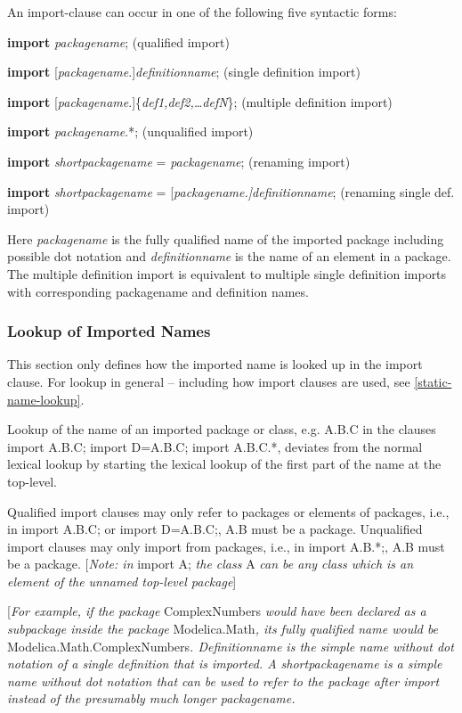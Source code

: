 \documentclass[10pt,a4paper]{report}
\def\doublelabel#1{\label{#1}\hypertarget{#1}{}}
\begin{document}
An import-clause can occur in one of the following five syntactic forms:

\textbf{import} \emph{packagename}; (qualified import)

\textbf{import} {[}\emph{packagename}.{]}\emph{definitionname}; (single
definition import)

\textbf{import}
{[}\emph{packagename}.{]}\{\emph{def1,def2,\ldots{}defN}\}; (multiple
definition import)

\textbf{import} \emph{packagename}.*; (unqualified import)

\textbf{import} \emph{shortpackagename} = \emph{packagename}; (renaming
import)

\textbf{import} \emph{shortpackagename} =
{[}\emph{packagename.{]}definitionname}; (renaming single def. import)

Here \emph{packagename} is the fully qualified name of the imported
package including possible dot notation and \emph{definitionname} is the
name of an element in a package. The multiple definition import is
equivalent to multiple single definition imports with corresponding
packagename and definition names.

\subsubsection{Lookup of Imported Names}\doublelabel{lookup-of-imported-names}

This section only defines how the imported name is looked up in the
import clause. For lookup in general -- including how import clauses are
used, see \ref{static-name-lookup}.

Lookup of the name of an imported package or class, e.g. A.B.C in the
clauses import A.B.C; import D=A.B.C; import A.B.C.*, deviates from the
normal lexical lookup by starting the lexical lookup of the first part
of the name at the top-level.

Qualified import clauses may only refer to packages or elements of
packages, i.e., in import A.B.C; or import D=A.B.C;, A.B must be a
package. Unqualified import clauses may only import from packages, i.e.,
in import A.B.*;, A.B must be a package. {[}\emph{Note: in} import A;
\emph{the class} A \emph{can be any class which is an element of the
unnamed top-level package}{]}

{[}\emph{For example, if the package} ComplexNumbers \emph{would have
been declared as a subpackage inside the package} Modelica.Math\emph{,
its fully qualified name would be} Modelica.Math.ComplexNumbers\emph{.
Definitionname is the simple name without dot notation of a single
definition that is imported. A shortpackagename is a simple name without
dot notation that can be used to refer to the package after import
instead of the presumably much longer packagename.}
\end{document}
